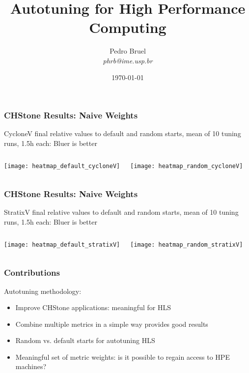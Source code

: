 \documentclass[10pt, compress, aspectratio=169, xcolor=table]{beamer}
\title{Autotuning for High Performance Computing}
\author{\footnotesize Pedro Bruel \\ {\scriptsize \emph{phrb@ime.usp.br}}}
\institute{\texttt{[image: imelogo]}\\[0.2cm] Instituto de Matemática e Estatística \\ Universidade de São Paulo}
\date{\scriptsize \today}
\begin{document}
\begin{frame}
    \frametitle{CHStone Results: Naive Weights}
    \alert{CycloneV} final relative values to \alert{default} and
    \alert{random} starts, mean of \alert{10 tuning runs}, \alert{1.5h each}:
    \alert{Bluer} is \alert{better}
    \begin{columns}[T,onlytextwidth]
        \begin{center}
            \texttt{[image: heatmap\_default\_cycloneV]}
        \end{center}

        \begin{center}
            \texttt{[image: heatmap\_random\_cycloneV]}
        \end{center}

    \end{columns}
\end{frame}

\begin{frame}
    \frametitle{CHStone Results: Naive Weights}
    \alert{StratixV} final relative values to \alert{default} and
    \alert{random} starts, mean of \alert{10 tuning runs}, \alert{1.5h each}:
    \alert{Bluer} is \alert{better}

    \begin{columns}[T,onlytextwidth]
        \begin{center}
            \texttt{[image: heatmap\_default\_stratixV]}
        \end{center}

        \begin{center}
            \texttt{[image: heatmap\_random\_stratixV]}
        \end{center}

    \end{columns}
\end{frame}

\begin{frame}
    \frametitle{Contributions}
    \alert{Autotuning methodology}:
    \begin{itemize}
        \item Improve CHStone applications: \alert{meaningful} for HLS
        \item Combine \alert{multiple metrics in a simple way} provides good
            results
        \item \alert{Random vs. default} starts for autotuning HLS
        \item \alert{Meaningful set of metric weights}: is it possible to
            regain access to HPE machines?
    \end{itemize}
\end{frame}
\end{document}
